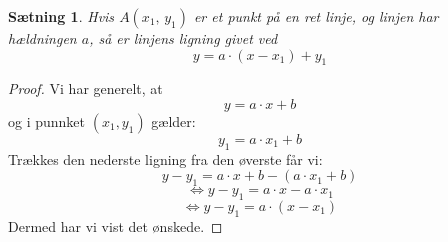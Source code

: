 \documentclass[12pt,oneside,a4paper]{article}
\newtheorem{thm}{Sætning}[section]
\begin{document}

\begin{thm}
    Hvis $A(x_1,\,y_1)$ er et punkt på en ret linje, og linjen har hældningen
    $a$, så er linjens ligning givet ved
    $$
    y = a\cdot (x-x_1) + y_1 
    $$
\end{thm}
\begin{proof}
    Vi har generelt, at 
    $$
    y = a\cdot x + b
    $$
    og i punnket $(x_1, y_1)$ gælder:
    $$
    y_1 = a\cdot x_1 + b
    $$
    Trækkes den nederste ligning fra den øverste får vi:
    $$
    y-y_1 = a \cdot x + b - (a \cdot x_1 + b)
    $$
    $$
    \Leftrightarrow y-y_1 = a \cdot x - a \cdot x_1
    $$
    $$
    \Leftrightarrow y-y_1 = a \cdot (x - x_1)
    $$
    Dermed har vi vist det ønskede.
\end{proof}
\end{document}
